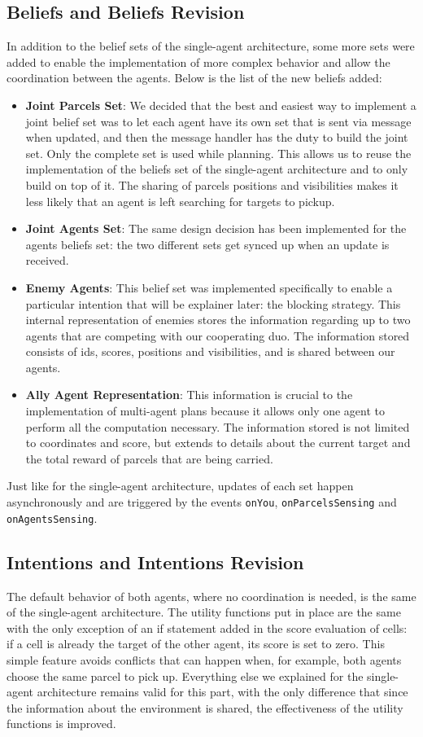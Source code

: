 \documentclass[a4paper, 11pt]{article}
\begin{document}
\subsection{Beliefs and Beliefs Revision}
In addition to the belief sets of the single-agent architecture, some more sets were added to enable the implementation of more complex behavior and allow the coordination between the agents. Below is the list of the new beliefs added:
\begin{itemize}
\item \textbf{Joint Parcels Set}: We decided that the best and easiest way to implement a joint belief set was to let each agent have its own set that is sent via message when updated, and then the message handler has the duty to build the joint set. Only the complete set is used while planning. This allows us to reuse the implementation of the beliefs set of the single-agent architecture and to only build on top of it. The sharing of parcels positions and visibilities makes it less likely that an agent is left searching for targets to pickup.
\item \textbf{Joint Agents Set}: The same design decision has been implemented for the agents beliefs set: the two different sets get synced up when an update is received.
\item \textbf{Enemy Agents}: This belief set was implemented specifically to enable a particular intention that will be explainer later: the blocking strategy. This internal representation of enemies stores the information regarding up to two agents that are competing with our cooperating duo. The information stored consists of ids, scores, positions and visibilities, and is shared between our agents.
\item \textbf{Ally Agent Representation}: This information is crucial to the implementation of multi-agent plans because it allows only one agent to perform all the computation necessary. The information stored is not limited to coordinates and score, but extends to details about the current target and the total reward of parcels that are being carried.
\end{itemize}

Just like for the single-agent architecture, updates of each set happen asynchronously and are triggered by the events \verb|onYou|, \verb|onParcelsSensing| and \verb|onAgentsSensing|.


\subsection{Intentions and Intentions Revision}
The default behavior of both agents, where no coordination is needed, is the same of the single-agent architecture. The utility functions put in place are the same with the only exception of an if statement added in the score evaluation of cells: if a cell is already the target of the other agent, its score is set to zero. This simple feature avoids conflicts that can happen when, for example, both agents choose the same parcel to pick up. Everything else we explained for the single-agent architecture remains valid for this part, with the only difference that since the information about the environment is shared, the effectiveness of the utility functions is improved.
\end{document}
